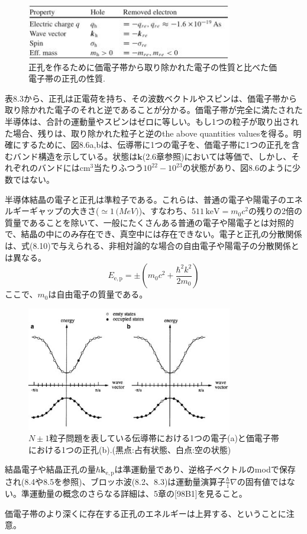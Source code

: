 \documentclass[11pt,a4j,uplatex]{jsarticle}
\begin{document}
\setcounter{figure}{2}
\begin{figure}[b]
  \centering
  \includegraphics[clip,width=9cm]{8_3.JPG}
  \caption{正孔を作るために価電子帯から取り除かれた電子の性質と比べた価電子帯の正孔の性質.}
  \label{table8.3}
\end{figure}

表8.3から、正孔は正電荷を持ち、その波数ベクトルやスピンは、価電子帯から取り除かれた電子のそれと逆であることが分かる。価電子帯が完全に満たされた半導体は、合計の運動量やスピンはゼロに等しい。もし1つの粒子が取り出された場合、残りは、取り除かれた粒子と逆のthe above quantities valuesを得る。明確にするために、図8.6a,bは、伝導帯に1つの電子を、価電子帯に1つの正孔を含むバンド構造を示している。状態は$\bm{k}$(2.6章参照)においては等価で、しかし、それぞれのバンドには$\mathrm{cm}^3$当たりふつう$10^{22}-10^{23}$の状態があり、図8.6のように少数ではない。

半導体結晶の電子と正孔は準粒子である。これらは、普通の電子や陽電子のエネルギーギャップの大きさ($\simeq1\,\mathrm(MeV)$)、すなわち、$511\,\mathrm{keV}=m_0c^2$の残りの2倍の質量であることを除いて、一般にたくさんある普通の電子や陽電子とは対照的で、結晶の中にのみ存在でき、真空中には存在できない。電子と正孔の分散関係は、式(8.10)で与えられる、非相対論的な場合の自由電子や陽電子の分散関係とは異なる。
\begin{equation}
  E_{\mathrm{e,p}}=\pm\left(m_0c^2+\frac{\hbar^2k^2}{2m_0}\right)
  \tag{8.10}
\end{equation}
ここで、$m_0$は自由電子の質量である。

\renewcommand{\figurename}{図}%
\setcounter{figure}{5}
\begin{figure}[tb]
  \centering
  \includegraphics[clip,width=9cm]{8_6.JPG}
  \caption{$N\pm1$粒子問題を表している伝導帯における1つの電子(a)と価電子帯における1つの正孔(b).(黒点:占有状態、白点:空の状態)}
  \label{8.6}
\end{figure}

結晶電子や結晶正孔の量$\hbar\bm{k}_{\mathrm{e,p}}$は準運動量であり、逆格子ベクトルのmodで保存され(8.4や8.5を参照)、ブロッホ波(8.2、8.3)は運動量演算子$\frac{\hbar}{\mathrm{i}}\nabla$の固有値ではない。準運動量の概念のさらなる詳細は、5章の[98B1]を見ること。

価電子帯のより深くに存在する正孔のエネルギーは上昇する、ということに注意。
\end{document}

